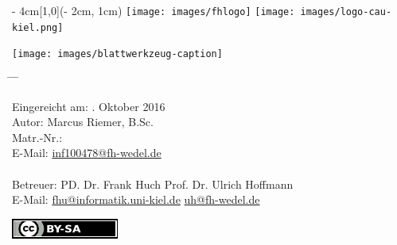 
\begin{titlepage}
  \vspace*{25ex}
  \begin{textblock*}{\paperwidth - 4cm}[1,0](\paperwidth - 2cm, 1cm)
    \centering
    \texttt{[image: images/fhlogo]}
    \hfill
    \texttt{[image: images/logo-cau-kiel.png]}
  \end{textblock*}
  \begin{center}
    \sffamily{}
    \texttt{[image: images/blattwerkzeug-caption]} \\[4ex]
    {\Large\docsubtitle}
  \end{center}
  \vspace*{20ex}
  \begin{tabbing}
    \hspace{8em} \= \hspace{14em} \= \hspace{8em} \= \kill

    Eingereicht am: . Oktober 2016 \\[5ex]
    Autor: \> Marcus Riemer, B.Sc. \\
    Matr.-Nr.:  \\
    E-Mail: \> \href{mailto:inf100478@fh-wedel.de}{inf100478@fh-wedel.de} \\

    \\
    Betreuer: \> PD. Dr. Frank Huch  \> Prof. Dr. Ulrich Hoffmann \\
    E-Mail: \> \href{mailto:fhu@informatik.uni-kiel.de}{fhu@informatik.uni-kiel.de} \> \href{mailto:uh@fh-wedel.de}{uh@fh-wedel.de}
  \end{tabbing}
  \vfill
  \centering \includegraphics{images/licenselogo}
\end{titlepage}

\restoregeometry                 %

